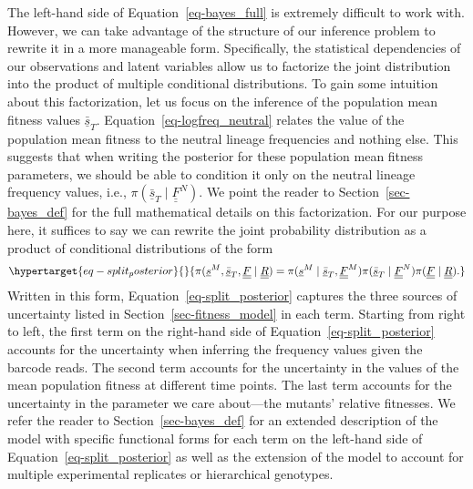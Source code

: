 \documentclass[
]{scrartcl}
\begin{document}
\begin{refsegment}
The left-hand side of Equation~\ref{eq-bayes_full} is extremely
difficult to work with. However, we can take advantage of the structure
of our inference problem to rewrite it in a more manageable form.
Specifically, the statistical dependencies of our observations and
latent variables allow us to factorize the joint distribution into the
product of multiple conditional distributions. To gain some intuition
about this factorization, let us focus on the inference of the
population mean fitness values \(\underline{\bar{s}}_T\).
Equation~\ref{eq-logfreq_neutral} relates the value of the population
mean fitness to the neutral lineage frequencies and nothing else. This
suggests that when writing the posterior for these population mean
fitness parameters, we should be able to condition it only on the
neutral lineage frequency values, i.e.,
\(\pi(\underline{\bar{s}}_T \mid \underline{\underline{F}}^N)\). We
point the reader to Section~\ref{sec-bayes_def} for the full
mathematical details on this factorization. For our purpose here, it
suffices to say we can rewrite the joint probability distribution as a
product of conditional distributions of the form
\begin{equation}\protect\hypertarget{eq-split_posterior}{}{
\pi(
    \underline{s}^M, \underline{\bar{s}}_T, \underline{\underline{F}} \mid
    \underline{\underline{R}}
) =
\pi(
    \underline{s}^M \mid \underline{\bar{s}}_T, \underline{\underline{F}}^M
)
\pi(
    \underline{\bar{s}}_T \mid \underline{\underline{F}}^N
)
\pi(\underline{\underline{F}} \mid \underline{\underline{R}}).
}\label{eq-split_posterior}\end{equation} Written in this form,
Equation~\ref{eq-split_posterior} captures the three sources of
uncertainty listed in Section~\ref{sec-fitness_model} in each term.
Starting from right to left, the first term on the right-hand side of
Equation~\ref{eq-split_posterior} accounts for the uncertainty when
inferring the frequency values given the barcode reads. The second term
accounts for the uncertainty in the values of the mean population
fitness at different time points. The last term accounts for the
uncertainty in the parameter we care about---the mutants' relative
fitnesses. We refer the reader to Section~\ref{sec-bayes_def} for an
extended description of the model with specific functional forms for
each term on the left-hand side of Equation~\ref{eq-split_posterior} as
well as the extension of the model to account for multiple experimental
replicates or hierarchical genotypes.

\hypertarget{variational-inference}{%
}
\end{refsegment}
\end{document}
